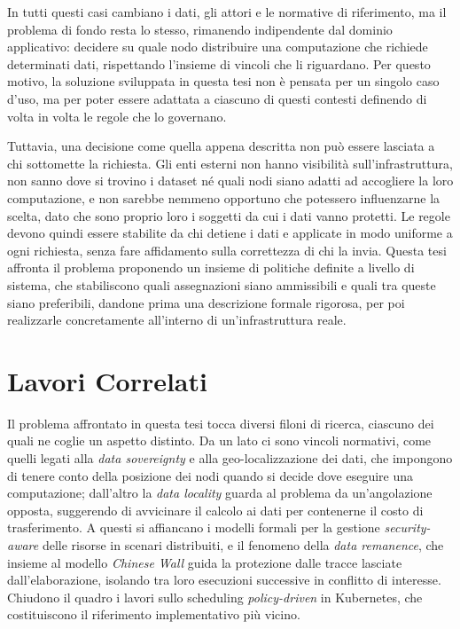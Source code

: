 In tutti questi casi cambiano i dati, gli attori e le normative di riferimento, ma il problema di fondo resta lo stesso, rimanendo indipendente dal dominio applicativo: decidere su quale nodo distribuire una computazione che richiede determinati dati, rispettando l'insieme di vincoli che li riguardano. Per questo motivo, la soluzione sviluppata in questa tesi non è pensata per un singolo caso d'uso, ma per poter essere adattata a ciascuno di questi contesti definendo di volta in volta le regole che lo governano.

Tuttavia, una decisione come quella appena descritta non può essere lasciata a chi sottomette la richiesta. Gli enti esterni non hanno visibilità sull'infrastruttura, non sanno dove si trovino i dataset né quali nodi siano adatti ad accogliere la loro computazione, e non sarebbe nemmeno opportuno che potessero influenzarne la scelta, dato che sono proprio loro i soggetti da cui i dati vanno protetti. Le regole devono quindi essere stabilite da chi detiene i dati e applicate in modo uniforme a ogni richiesta, senza fare affidamento sulla correttezza di chi la invia. Questa tesi affronta il problema proponendo un insieme di politiche definite a livello di sistema, che stabiliscono quali assegnazioni siano ammissibili e quali tra queste siano preferibili, dandone prima una descrizione formale rigorosa, per poi realizzarle concretamente all'interno di un'infrastruttura reale.


\section{Lavori Correlati}
\label{sec:stato_arte}

Il problema affrontato in questa tesi tocca diversi filoni di ricerca, ciascuno dei quali ne coglie un aspetto distinto. Da un lato ci sono vincoli normativi, come quelli legati alla \emph{data sovereignty} e alla geo-localizzazione dei dati, che impongono di tenere conto della posizione dei nodi quando si decide dove eseguire una computazione; dall'altro la \emph{data locality} guarda al problema da un'angolazione opposta, suggerendo di avvicinare il calcolo ai dati per contenerne il costo di trasferimento. A questi si affiancano i modelli formali per la gestione \emph{security-aware} delle risorse in scenari distribuiti, e il fenomeno della \emph{data remanence}, che insieme al modello \emph{Chinese Wall} guida la protezione dalle tracce lasciate dall'elaborazione, isolando tra loro esecuzioni successive in conflitto di interesse. Chiudono il quadro i lavori sullo scheduling \emph{policy-driven} in Kubernetes, che costituiscono il riferimento implementativo più vicino.

